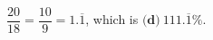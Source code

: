 $\dfrac{20}{18}=\dfrac{10}{9}=1.\overline{1}$, which is $\boxed{\textbf{(d)}\ 111.\overline{1}\%}$.
